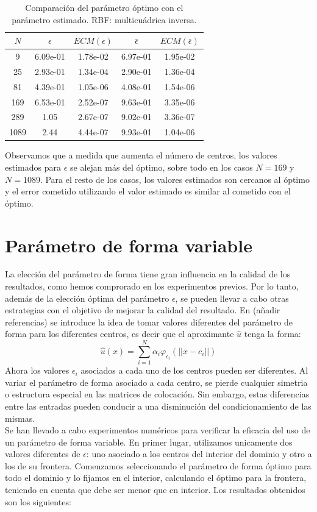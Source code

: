 \documentclass[11pt,a4paper]{article}
\begin{document}
\begin{table}[H]
\centering
\caption{Comparación del parámetro óptimo con el parámetro estimado. RBF: multicuádrica inversa.}
\centering
\begin{tabular}{|c|cccc|}
\hline
$N$ & $\epsilon$ &$ECM(\epsilon)$ & $\bar{\epsilon}$ & $ECM(\bar{\epsilon})$ \\
\hline
9 & 6.09e-01 & 1.78e-02 & 6.97e-01 & 1.95e-02 \\
25 & 2.93e-01&1.34e-04& 2.90e-01& 1.36e-04\\
81 & 4.39e-01&1.05e-06&4.08e-01&1.54e-06\\
169 & 6.53e-01&2.52e-07& 9.63e-01&3.35e-06\\
289&1.05 & 2.67e-07& 9.02e-01 & 3.36e-07\\
1089 & 2.44 & 4.44e-07 & 9.93e-01& 1.04e-06\\
\hline
\end{tabular}
\end{table}
Observamos que a medida que aumenta el número de centros, los valores estimados para $\epsilon$ se alejan más del óptimo, sobre todo en los casos $N=169 $ y $N=1089$. Para el resto de los casos, los valores estimados son cercanos al óptimo y el error cometido utilizando el valor estimado es similar al cometido con el óptimo. 
\section{Parámetro de forma variable}
La elección del parámetro de forma tiene gran influencia en la calidad de los resultados, como hemos comprorado en los experimentos previos. Por lo tanto, además de la elección óptima del parámetro $\epsilon$, se pueden llevar a cabo otras estrategias con el objetivo de mejorar la calidad del resultado. En (añadir referencias) se introduce la idea de tomar valores diferentes del parámetro de forma para los diferentes centros, es decir que el aproximante $\hat{u}$ tenga la forma: 
$$\hat{u}(x)=\displaystyle \sum_{i=1}^N \alpha_i \varphi_{\epsilon_i}(||x-c_i||)$$
Ahora los valores $\epsilon_i$ asociados a cada uno de los centros pueden ser diferentes. Al variar el parámetro de forma asociado a cada centro, se pierde cualquier simetria o estructura especial en las matrices de colocación. Sin embargo, estas diferencias entre las entradas pueden conducir a una disminución del condicionamiento de las mismas. \\
Se han llevado a cabo experimentos numéricos para verificar la eficacia del uso de un parámetro de forma variable. En primer  lugar, utilizamos unicamente dos valores diferentes de $\epsilon$: uno asociado a los centros del interior del dominio y otro a los de su frontera.  Comenzamos seleccionando el parámetro de forma óptimo para todo el dominio y lo fijamos en el interior, calculando el óptimo para la frontera, teniendo en cuenta que debe ser menor que en interior. Los resultados obtenidos son los siguientes: 
\end{document}
